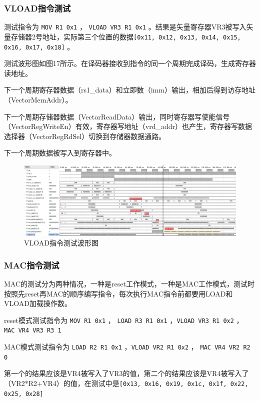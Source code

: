 \documentclass[UTF8]{ctexart}
\begin{document}
\subsubsection{VLOAD指令测试}

测试指令为 \verb|MOV R1 0x1| ， \verb|VLOAD VR3 R1 0x1| 。结果是矢量寄存器VR3被写入矢量存储器2号地址，实际第三个位置的数据\verb|[0x11, 0x12, 0x13, 0x14, 0x15, 0x16, 0x17, 0x18]| 。

测试波形图如图17所示。在译码器接收到指令的同一个周期完成译码，生成寄存器读地址。

下一个周期寄存器数据（rs1\_data）和立即数（imm）输出，相加后得到访存地址（VectorMemAddr）。

下一个周期存储器数据（VectorReadData）输出，同时寄存器写使能信号（VectorRegWriteEn）有效，寄存器写地址（vrd\_addr）也产生，寄存器写数据选择器（VectorRegRdSel）切换到存储器数据通路。

下一个周期数据被写入到寄存器中。

\begin{figure}[htbp]
    \centering
    \includegraphics[width=16cm]{pic/VPU_VLOAD(1).png}
    \caption{VLOAD指令测试波形图}
\end{figure}

\subsubsection{MAC指令测试}

MAC的测试分为两种情况，一种是reset工作模式，一种是MAC工作模式，测试时按照先reset再MAC的顺序编写指令，每次执行MAC指令前都要用LOAD和VLOAD加载操作数。

reset模式测试指令为 \verb|MOV R1 0x1| ， \verb|LOAD R3 R1 0x1| ，\verb|VLOAD VR3 R1 0x2| ， \verb|MAC VR4 VR3 R3 1|

MAC模式测试指令为   \verb|LOAD R2 R1 0x1| ，\verb|VLOAD VR2 R1 0x2| ， \verb|MAC VR4 VR2 R2 0|

第一个的结果应该是VR4被写入了VR3的值，第二个的结果应该是VR4被写入了（VR2*R2+VR4）的值，在测试中是\verb|[0x13, 0x16, 0x19, 0x1c, 0x1f, 0x22, 0x25, 0x28]|
\end{document}
